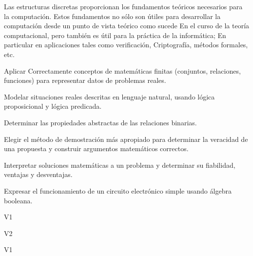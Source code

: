 \begin{syllabus}


\begin{justification}
Las estructuras discretas proporcionan los fundamentos teóricos necesarios para la computación. Estos fundamentos no sólo son útiles para desarrollar la computación desde un punto de vista teórico como sucede
En el curso de la teoría computacional, pero también es útil para la práctica de la informática; En particular en aplicaciones tales como verificación,
Criptografía, métodos formales, etc.
\end{justification}

\begin{goals}
\item Aplicar Correctamente conceptos de matemáticas finitas (conjuntos, relaciones, funciones) para representar datos de problemas reales.
\item Modelar situaciones reales descritas en lenguaje natural, usando lógica proposicional y lógica predicada.
\item Determinar las propiedades abstractas de las relaciones binarias.
\item Elegir el método de demostración más apropiado para determinar la veracidad de una propuesta y construir argumentos matemáticos correctos.
\item Interpretar soluciones matemáticas a un problema y determinar su fiabilidad, ventajas y desventajas.
\item Expresar el funcionamiento de un circuito electrónico simple usando álgebra booleana.
\end{goals}

\begin{outcomes}{V1}
    \item {}
    \item {}
\end{outcomes}

\begin{outcomes}{V2}
    \item {}
    \item {}
\end{outcomes}

\begin{competences}{V1}
    \item {}
    \item {}
\end{competences} 


\end{syllabus}
